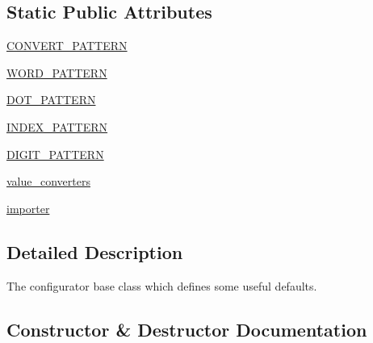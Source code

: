 \subsection*{Static Public Attributes}
\begin{DoxyCompactItemize}
\item 
\hyperlink{classpip_1_1__vendor_1_1distlib_1_1compat_1_1BaseConfigurator_a2cfcd861c003fc6270157f0ea30865b9}{C\+O\+N\+V\+E\+R\+T\+\_\+\+P\+A\+T\+T\+E\+RN}
\item 
\hyperlink{classpip_1_1__vendor_1_1distlib_1_1compat_1_1BaseConfigurator_a8531abf5f0c847aee7235a8827ccb4bc}{W\+O\+R\+D\+\_\+\+P\+A\+T\+T\+E\+RN}
\item 
\hyperlink{classpip_1_1__vendor_1_1distlib_1_1compat_1_1BaseConfigurator_acf7eb948c627fb1ec0fc035f8175a15a}{D\+O\+T\+\_\+\+P\+A\+T\+T\+E\+RN}
\item 
\hyperlink{classpip_1_1__vendor_1_1distlib_1_1compat_1_1BaseConfigurator_aaf951c11bfdc4d991a6539dcb6bb84ae}{I\+N\+D\+E\+X\+\_\+\+P\+A\+T\+T\+E\+RN}
\item 
\hyperlink{classpip_1_1__vendor_1_1distlib_1_1compat_1_1BaseConfigurator_aa8f29b8586c3cfbc6e3264d3f2862b4b}{D\+I\+G\+I\+T\+\_\+\+P\+A\+T\+T\+E\+RN}
\item 
\hyperlink{classpip_1_1__vendor_1_1distlib_1_1compat_1_1BaseConfigurator_a2d03f6e15ffd941515726527c348d315}{value\+\_\+converters}
\item 
\hyperlink{classpip_1_1__vendor_1_1distlib_1_1compat_1_1BaseConfigurator_ac30b4328024f6206d4691733dcfe0283}{importer}
\end{DoxyCompactItemize}


\subsection{Detailed Description}
\begin{DoxyVerb}The configurator base class which defines some useful defaults.
\end{DoxyVerb}
 

\subsection{Constructor \& Destructor Documentation}
\mbox{\label{classpip_1_1__vendor_1_1distlib_1_1compat_1_1BaseConfigurator_a84644a9fa51fa50c1639f6f7e043f80b}} 
